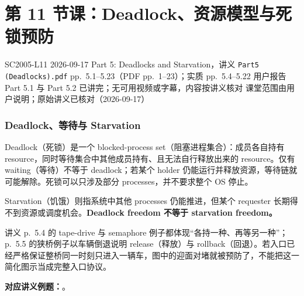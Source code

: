 
\section{第 11 节课：Deadlock、资源模型与死锁预防}
\label{lecture:SC2005-L11}

\lecturemeta
  {SC2005-L11}
  {2026-09-17}
  {Part 5: Deadlocks and Starvation，讲义 \texttt{Part5 (Deadlocks).pdf}}
  {pp.~5.1--5.23（PDF pp.~1--23）；实质 pp.~5.4--5.22}
  {用户报告 Part 5.1 与 Part 5.2 已讲完；无可用视频或字幕，内容按讲义核对}
  {课堂范围由用户说明；原始讲义已核对（2026-09-17）}



\subsubsection{Deadlock、等待与 Starvation}

Deadlock（死锁）是一个 blocked-process set（阻塞进程集合）：成员各自持有 resource，同时等待集合中其他成员持有、且无法自行释放出来的 resource。仅有 waiting（等待）不等于 deadlock；若某个 holder 仍能运行并释放资源，等待链就可能解除。死锁可以只涉及部分 processes，并不要求整个 OS 停止。

Starvation（饥饿）则指系统中其他 processes 仍能推进，但某个 requester 长期得不到资源或调度机会。\textbf{Deadlock freedom 不等于 starvation freedom。}

讲义 p.~5.4 的 tape-drive 与 semaphore 例子都体现“各持一种、再等另一种”；p.~5.5 的狭桥例子以车辆倒退说明 release（释放）与 rollback（回退）。若入口已经严格保证整桥同一时刻只进入一辆车，图中的迎面对堵就被预防了，不能把这一简化图示当成完整入口协议。

\textbf{对应讲义例题：}。

